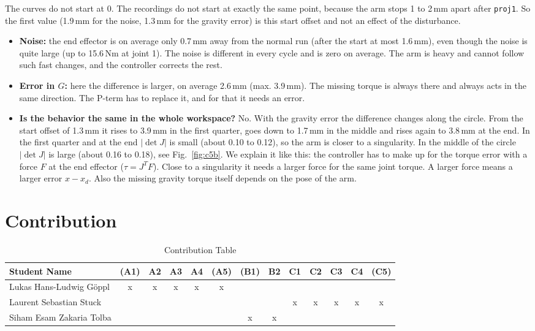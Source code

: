 \documentclass[11pt, a4paper]{article}
\begin{document}
The curves do not start at 0. The recordings do not start at exactly the same point, because the
arm stops 1 to 2\,mm apart after \texttt{proj1}. So the first value (1.9\,mm for the noise, 1.3\,mm
for the gravity error) is this start offset and not an effect of the disturbance.

\begin{itemize}
  \item \textbf{Noise:} the end effector is on average only 0.7\,mm away from the normal run
        (after the start at most 1.6\,mm), even though the noise is quite large (up to 15.6\,Nm at
        joint 1). The noise is
        different in every cycle and is zero on average. The arm is heavy and cannot follow such fast
        changes, and the controller corrects the rest.
  \item \textbf{Error in $G$:} here the difference is larger, on average 2.6\,mm (max. 3.9\,mm). The
        missing torque is always there and always acts in the same direction. The P-term has to
        replace it, and for that it needs an error.
  \item \textbf{Is the behavior the same in the whole workspace?} No. With the gravity error the
        difference changes along the circle. From the start offset of 1.3\,mm it rises to 3.9\,mm in
        the first quarter, goes down to 1.7\,mm in the middle and rises again to 3.8\,mm at the end.
        In the first quarter and at the end $|\det J|$ is small (about 0.10 to 0.12), so the arm is
        closer to a singularity. In the middle of the circle $|\det J|$ is large (about 0.16 to
        0.18), see Fig.~\ref{fig:c5b}. We explain it like this: the
        controller has to make up for the torque error with a force $F$ at the end effector
        ($\tau = J^T F$). Close to a singularity it needs a larger force for the same joint torque. A
        larger force means a larger error $x - x_d$. Also the missing gravity torque itself depends on
        the pose of the arm.
\end{itemize}

\section*{Contribution}

\begin{table}[H]
  \centering
  \caption{Contribution Table}
  \small
  \setlength{\tabcolsep}{4pt}
  \begin{tabular}{| l | c | c | c | c | c | c | c | c | c | c | c | c |}
    \hline
    Student Name & (A1) & A2 & A3 & A4 & (A5) & (B1) & B2 & C1 & C2 & C3 & C4 & (C5) \\ \hline
    \hline
    Lukas Hans-Ludwig Göppl     & x & x & x & x & x &   &   &   &   &   &   &   \\ \hline
    Laurent Sebastian Stuck     &   &   &   &   &   &   &   & x & x & x & x & x \\ \hline
    Siham Esam Zakaria Tolba    &   &   &   &   &   & x & x &   &   &   &   &   \\ \hline
  \end{tabular}
\end{table}
\end{document}
